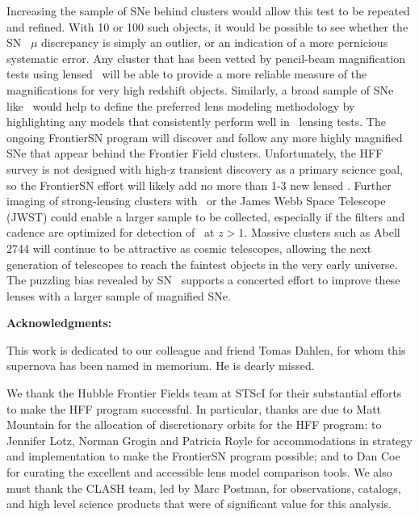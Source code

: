 Increasing the sample of SNe behind clusters 
would allow this test to be repeated and refined.  With 10 or 100 such
objects, it would be possible to see whether the SN \tomas\ $\mu$
discrepancy is simply an outlier, or an indication of a more
pernicious systematic error.  Any cluster that has been vetted by
pencil-beam magnification tests using lensed \SNIa\ will be able to
provide a more reliable measure of the magnifications for very high
redshift objects.  Similarly, a broad sample of SNe like \tomas\ would
help to define the preferred lens modeling methodology by highlighting
any models that consistently perform well in \SNIa\ lensing tests.
The ongoing FrontierSN program will discover and follow any more
highly magnified SNe that appear behind the Frontier Field
clusters. Unfortunately, the HFF survey is not designed with high-z
transient discovery as a primary science goal, so the FrontierSN
effort will likely add no more than 1-3 new lensed \SNIa. Further
imaging of strong-lensing clusters with \HST\ or the James Webb Space
Telescope (JWST) could enable a larger sample to be collected,
especially if the filters and cadence are optimized for detection
of \SNIa\ at $z>1$.  Massive clusters such as Abell 2744 will continue
to be attractive as cosmic telescopes, allowing the next generation of
telescopes to reach the faintest objects in the very early universe.
The puzzling bias revealed by SN \tomas\ supports a concerted effort
to improve these lenses with  a larger sample of
magnified SNe.


\bigskip


{\bf Acknowledgments:}

This work is dedicated to our colleague and friend Tomas Dahlen, for
whom this supernova has been named in memorium. He is dearly missed.

We thank the Hubble Frontier Fields team at STScI
for their substantial efforts to make the HFF program successful.  In
particular, thanks are due to Matt Mountain for the allocation of
discretionary orbits for the HFF program; to Jennifer Lotz, Norman
Grogin and Patricia Royle for accommodations in strategy and
implementation to make the FrontierSN program possible; and to Dan Coe
for curating the excellent and accessible lens model comparison tools.
We also must thank the CLASH team, led by Marc Postman, for
observations, catalogs, and high level science products that were of
significant value for this analysis.

